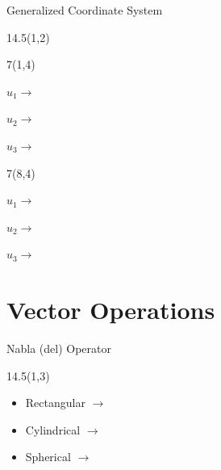 \begin{frame}{Generalized Coordinate System}
\begin{textblock}{14.5}(1,2)
\end{textblock}

\begin{textblock}{7}(1,4)

\scalebox{0.55}{
  
} %
\vspace{-6pt}

$u_1 \longrightarrow $

$u_2 \longrightarrow $

$u_3 \longrightarrow  $

\end{textblock}

\begin{textblock}{7}(8,4)

\scalebox{0.75}{
  
} %
\vspace{-18pt}

$u_1 \longrightarrow $

$u_2 \longrightarrow $

$u_3 \longrightarrow  $
\end{textblock}

\end{frame}



\section{Vector Operations}
\begin{frame}{Nabla (del) Operator}
\begin{textblock}{14.5}(1,3)
\begin{myblock}[0.9]{}

\end{myblock}

\begin{itemize}
\setlength\itemsep{8pt}
	\item Rectangular $\longrightarrow$
	\item Cylindrical $\longrightarrow$
	\item Spherical $\longrightarrow$
\end{itemize}
\end{textblock}
\end{frame}

